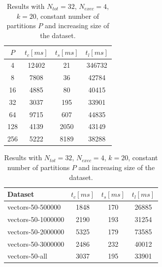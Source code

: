 \documentclass[a4paper, 11pt]{article}
\begin{document}
\begin{footnotesize}
\begin{table}[!htb]	
\parbox[t]{.45\linewidth}{
\centering
		\vspace{0pt}
		\begin{tabular}[htb]{c|c|c|c} 
			\hline
			\textbf{$P$} & \textbf{$t_c [ms]$} & \textbf{$t_s [ms]$} & \textbf{$t_l [ms]$} \\
			\hline
			4 &  12402 &  21 & 346732\\ 
			8 & 7808 &  36  & 42784\\
			16 &  4885 &  80 & 40415\\
			32 & 3037 &  195 & 33901\\
			64 &  9715&  607& 44835\\
			128 &  4139 & 2050 & 43149\\
			256 & 5222 &  8189 & 38288 \\
			\hline			
		\end{tabular}
		\vspace{10pt}
}
		\hfill	
\parbox[t]{.45\linewidth}{
		\centering
		\vspace{0pt}
		\begin{tabular}[htb]{l|c|c|c} 
			\hline
			\textbf{Dataset} & \textbf{$t_c [ms]$} & \textbf{$t_s [ms]$} & \textbf{$t_l [ms]$} \\
			\hline
			vectors-50-500000 &  1848 &  170 & 26885\\
			vectors-50-1000000 &  2190  &  193  & 31254 \\ 
			vectors-50-2000000 &  5325&    179& 73585\\
			vectors-50-3000000&  2486 &  232 &40012 \\
			vectors-50-all &  3037 &  195 & 33901\\
			\hline
		\end{tabular}
}
\hfill
\parbox[t]{.45\linewidth}{
		\caption{Results with dataset \textit{all}, $N_{tot} = 32$, $N_{exec} = 4$, $k=20$  and increasing $P$.}\label{table:b}
		}
				\hfill	
\parbox[t]{.45\linewidth}{
		\caption{Results with $N_{tot} = 32$, $N_{exec} = 4$, $k=20$, constant number of partitions $P$  and increasing size of the dataset.}\label{table:c}
			}
	\end{table}
\end{footnotesize}
\end{document}
